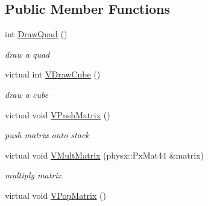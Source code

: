 \subsection*{Public Member Functions}
\begin{DoxyCompactItemize}
\item 
\hypertarget{classPlatform_1_1RenderGL_aed4693e193778c74e66ea6776926eadf}{
int \hyperlink{classPlatform_1_1RenderGL_aed4693e193778c74e66ea6776926eadf}{DrawQuad} ()}
\label{classPlatform_1_1RenderGL_aed4693e193778c74e66ea6776926eadf}

\begin{DoxyCompactList}\small\item\em draw a quad \item\end{DoxyCompactList}\item 
\hypertarget{classPlatform_1_1RenderGL_a64e1d95397c4b83eb44e0de558e2a83f}{
virtual int \hyperlink{classPlatform_1_1RenderGL_a64e1d95397c4b83eb44e0de558e2a83f}{VDrawCube} ()}
\label{classPlatform_1_1RenderGL_a64e1d95397c4b83eb44e0de558e2a83f}

\begin{DoxyCompactList}\small\item\em draw a cube \item\end{DoxyCompactList}\item 
\hypertarget{classPlatform_1_1RenderGL_a9af2425916a27d896aaf08af605769bc}{
virtual void \hyperlink{classPlatform_1_1RenderGL_a9af2425916a27d896aaf08af605769bc}{VPushMatrix} ()}
\label{classPlatform_1_1RenderGL_a9af2425916a27d896aaf08af605769bc}

\begin{DoxyCompactList}\small\item\em push matrix onto stack \item\end{DoxyCompactList}\item 
\hypertarget{classPlatform_1_1RenderGL_aa74ab0317c1332d549d0d4c3ca99bb8d}{
virtual void \hyperlink{classPlatform_1_1RenderGL_aa74ab0317c1332d549d0d4c3ca99bb8d}{VMultMatrix} (physx::PxMat44 \&matrix)}
\label{classPlatform_1_1RenderGL_aa74ab0317c1332d549d0d4c3ca99bb8d}

\begin{DoxyCompactList}\small\item\em multiply matrix \item\end{DoxyCompactList}\item 
\hypertarget{classPlatform_1_1RenderGL_a36d3bb9edd70ada05779d394088fb443}{
virtual void \hyperlink{classPlatform_1_1RenderGL_a36d3bb9edd70ada05779d394088fb443}{VPopMatrix} ()}
\label{classPlatform_1_1RenderGL_a36d3bb9edd70ada05779d394088fb443}


\end{DoxyCompactItemize}
